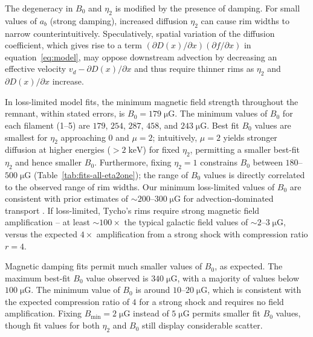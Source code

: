 \documentclass[manuscript]{aastex}  %
\newcommand*{\mt}{\mathrm}
\newcommand*{\unit}[1]{\;\mt{#1}}  %
\newcommand*{\abt}{\mathord{\sim}} %
\newcommand*{\ptl}{\partial}
\newcommand*{\Bmin}{B_{\mt{min}}}
\newcommand*{\muG}{\unit{\mu G}}
\begin{document}
The degeneracy in $B_0$ and $\eta_2$ is modified by the presence of damping.
For small values of $a_b$ (strong damping), increased diffusion $\eta_2$ can
cause rim widths to narrow counterintuitively.  Speculatively, spatial
variation of the diffusion coefficient, which gives rise to a
term $(\ptl D(x) / \ptl x) (\ptl f/\ptl x)$ in equation~\eqref{eq:model}, may
oppose downstream advection by decreasing an effective velocity $v_d - \ptl
D(x) / \ptl x$ and thus require thinner rims as $\eta_2$ and $\ptl D(x) / \ptl
x$ increase.

In loss-limited model fits, the minimum magnetic field strength throughout the
remnant, within stated errors, is $B_0 = 179 \muG$.  The minimum values of
$B_0$ for each filament (1--5) are $179$, $254$, $287$, $458$, and $243 \muG$.
Best fit $B_0$ values are smallest for $\eta_2$ approaching $0$ and $\mu =
2$; intuitively, $\mu = 2$ yields stronger diffusion at higher energies
($>2\unit{keV}$) for fixed $\eta_2$, permitting a smaller best-fit $\eta_2$ and
hence smaller $B_0$.  Furthermore, fixing $\eta_2 = 1$ constrains $B_0$ between
$180$--$500 \muG$ (Table~\ref{tab:fits-all-eta2one}); the range of $B_0$ values
is directly correlated to the observed range of rim widths.  Our minimum
loss-limited values of $B_0$ are consistent with prior estimates of $\abt
200$--$300 \muG$ for advection-dominated transport \citep{volk2005,
parizot2006, morlino2012}.  If loss-limited, Tycho's rims require strong
magnetic field amplification -- at least $\abt 100\times$ the typical galactic
field values of $\abt 2$--$3 \muG$, versus the expected $4\times$ amplification
from a strong shock with compression ratio $r=4$.

Magnetic damping fits permit much smaller values of $B_0$, as expected.
The maximum best-fit $B_0$ value observed is $340 \muG$, with a majority of
values below $100 \muG$.  The minimum value of $B_0$ is around $10$--$20 \muG$,
which is consistent with the expected compression ratio of $4$ for a strong
shock and requires no field amplification.  Fixing $\Bmin = 2 \muG$ instead of
$5 \muG$ permits smaller fit $B_0$ values, though fit values for both $\eta_2$
and $B_0$ still display considerable scatter.

\end{document}

